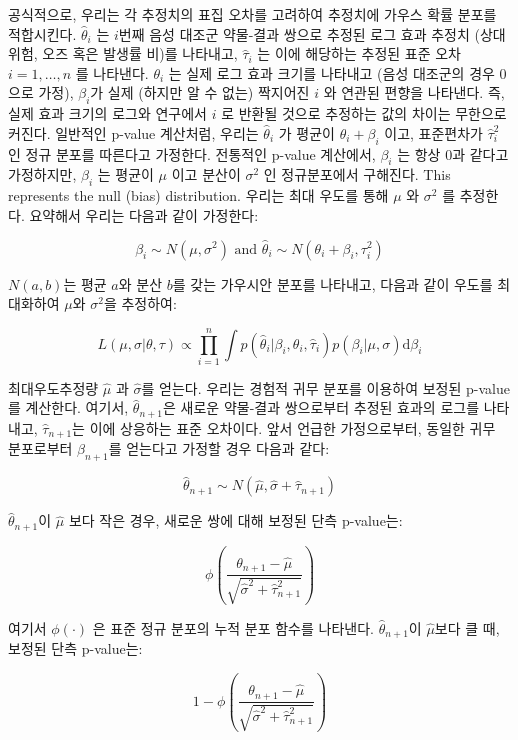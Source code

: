 \documentclass[11pt]{book}
\theoremstyle{definition}
\theoremstyle{definition}
\theoremstyle{definition}
\theoremstyle{remark}
\begin{document}
공식적으로, 우리는 각 추정치의 표집 오차를 고려하여 추정치에 가우스 확률
분포를 적합시킨다. \(\hat{\theta}_i\) 는 \(i\)번째 음성 대조군 약물-결과
쌍으로 추정된 로그 효과 추정치 (상대 위험, 오즈 혹은 발생률 비)를
나타내고, \(\hat{\tau}_i\) 는 이에 해당하는 추정된 표준 오차
\(i=1,\ldots,n\) 를 나타낸다. \(\theta_i\) 는 실제 로그 효과 크기를
나타내고 (음성 대조군의 경우 0으로 가정), \(\beta_i\)가 실제 (하지만 알
수 없는) 짝지어진 \(i\) 와 연관된 편향을 나타낸다. 즉, 실제 효과 크기의
로그와 연구에서 \(i\) 로 반환될 것으로 추정하는 값의 차이는 무한으로
커진다. 일반적인 p-value 계산처럼, 우리는 \(\hat{\theta}_i\) 가 평균이
\(\theta_i + \beta_i\) 이고, 표준편차가 \(\hat{\tau}_i^2\) 인 정규
분포를 따른다고 가정한다. 전통적인 p-value 계산에서, \(\beta_i\) 는 항상
0과 같다고 가정하지만, \(\beta_i\) 는 평균이 \(\mu\) 이고 분산이
\(\sigma^2\) 인 정규분포에서 구해진다. This represents the null (bias)
distribution. 우리는 최대 우도를 통해 \(\mu\) 와 \(\sigma^2\) 를
추정한다. 요약해서 우리는 다음과 같이 가정한다:

\[\beta_i \sim N(\mu,\sigma^2) \text{  and  } \hat{\theta}_i \sim N(\theta_i + \beta_i, \tau_i^2)\]

\(N(a,b)\)는 평균 \(a\)와 분산 \(b\)를 갖는 가우시안 분포를 나타내고,
다음과 같이 우도를 최대화하여 \(\mu\)와 \(\sigma^2\)을 추정하여:

\[L(\mu, \sigma | \theta, \tau) \propto \prod_{i=1}^{n}\int p(\hat{\theta}_i|\beta_i, \theta_i, \hat{\tau}_i)p(\beta_i|\mu, \sigma) \text{d}\beta_i\]

최대우도추정량 \(\hat{\mu}\) 과 \(\hat{\sigma}\)를 얻는다. 우리는 경험적
귀무 분포를 이용하여 보정된 p-value를 계산한다. 여기서,
\(\hat{\theta}_{n+1}\)은 새로운 약물-결과 쌍으로부터 추정된 효과의
로그를 나타내고, \(\hat{\tau}_{n+1}\)는 이에 상응하는 표준 오차이다.
앞서 언급한 가정으로부터, 동일한 귀무 분포로부터 \(\beta_{n+1}\)를
얻는다고 가정할 경우 다음과 같다:

\[\hat{\theta}_{n+1} \sim N(\hat{\mu}, \hat{\sigma} + \hat{\tau}_{n+1})\]

\(\hat{\theta}_{n+1}\)이 \(\hat{\mu}\) 보다 작은 경우, 새로운 쌍에 대해
보정된 단측 p-value는:

\[\phi\left(\frac{\theta_{n+1} - \hat{\mu}}{\sqrt{\hat{\sigma}^2 + \hat{\tau}_{n+1}^2}}\right)\]

여기서 \(\phi(\cdot)\) 은 표준 정규 분포의 누적 분포 함수를 나타낸다.
\(\hat{\theta}_{n+1}\)이 \(\hat{\mu}\)보다 클 때, 보정된 단측 p-value는:

\[1-\phi\left(\frac{\theta_{n+1} - \hat{\mu}}{\sqrt{\hat{\sigma}^2 + \hat{\tau}_{n+1}^2}}\right)\]
\end{document}
